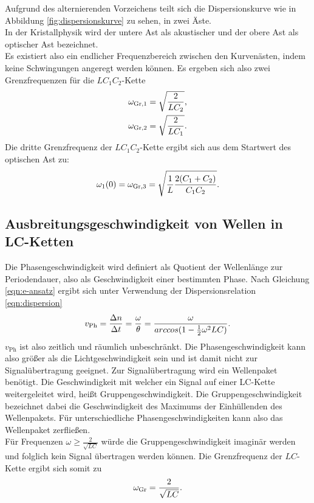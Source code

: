 Aufgrund des alternierenden Vorzeichens teilt sich die Dispersionskurve wie in Abbildung \ref{fig:dispersionskurve} zu sehen, in zwei Äste. \\
In der Kristallphysik wird der untere Ast als akustischer und der obere Ast als optischer Ast bezeichnet.\\
Es existiert also ein endlicher Frequenzbereich zwischen den Kurvenästen, indem keine Schwingungen angeregt werden können.
Es ergeben sich also zwei Grenzfrequenzen für die $LC_{\mathrm{1}}C_{\mathrm{2}}$-Kette
\begin{equation}
	\centering
	\label{eqn:wgrenz_lc1c2}
	\begin{gathered}
		\omega_{\mathrm{Gr,1}}=\sqrt{\frac{2}{LC_{\mathrm{2}}}} \text{,}\\
		\omega_{\mathrm{Gr,2}}=\sqrt{\frac{2}{LC_{\mathrm{1}}}} \text{.}
	\end{gathered}
\end{equation}
Die dritte Grenzfrequenz der $LC_{\mathrm{1}}C_{\mathrm{2}}$-Kette ergibt sich aus dem Startwert des optischen Ast zu:
\begin{equation}
	\centering
	\label{eqn:wgrenz_lc1c2-3}
	\omega_{1}(0)=\omega_{\mathrm{Gr,3}}=\sqrt{\frac{1}{L}\frac{2(C_1+C_2)}{C_1C_2}}.
\end{equation}
\FloatBarrier

\subsection{Ausbreitungsgeschwindigkeit von Wellen in LC-Ketten}
Die Phasengeschwindigkeit wird definiert als Quotient der Wellenlänge zur Periodendauer, also als Geschwindigkeit einer bestimmten Phase.
Nach Gleichung \eqref{eqn:e-ansatz} ergibt sich unter Verwendung der Dispersionsrelation  \eqref{eqn:dispersion}
\begin{equation}
	\centering
	\label{eqn:v-phase}
	v_{\mathrm{Ph}}=\frac{ \Delta n}{ \Delta t}=\frac{\omega}{\theta}=\frac{\omega}{arccos(1-\frac{1}{2}\omega^2LC)}.
\end{equation}
$v_{\mathrm{Ph}}$ ist also zeitlich und räumlich unbeschränkt. Die Phasengeschwindigkeit kann also größer als die Lichtgeschwindigkeit sein und ist damit nicht zur Signalübertragung geeignet.
Zur Signalübertragung wird ein Wellenpaket benötigt.
Die Geschwindigkeit mit welcher ein Signal auf einer LC-Kette weitergeleitet wird, heißt Gruppengeschwindigkeit.
Die Gruppengeschwindigkeit bezeichnet dabei die Geschwindigkeit des Maximums der Einhüllenden des Wellenpakets.
Für unterschiedliche Phasengeschwindigkeiten kann also das Wellenpaket zerfließen.\\
Für Frequenzen $\omega\geq\frac{2}{\sqrt{LC}}$ würde die Gruppengeschwindigkeit imaginär werden und folglich kein Signal übertragen werden können.
Die Grenzfrequenz der $LC$-Kette ergibt sich somit zu
\begin{equation}
	\centering
	\label{eqn:wgrenz_lc}
	\omega_{\mathrm{Gr}}=\frac{2}{\sqrt{LC}}.
\end{equation}
\FloatBarrier

